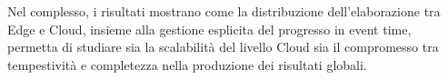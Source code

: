 Nel complesso, i risultati mostrano come la distribuzione dell'elaborazione
tra Edge e Cloud, insieme alla gestione esplicita del progresso in event time,
permetta di studiare sia la scalabilità del livello Cloud sia il compromesso
tra tempestività e completezza nella produzione dei risultati globali.